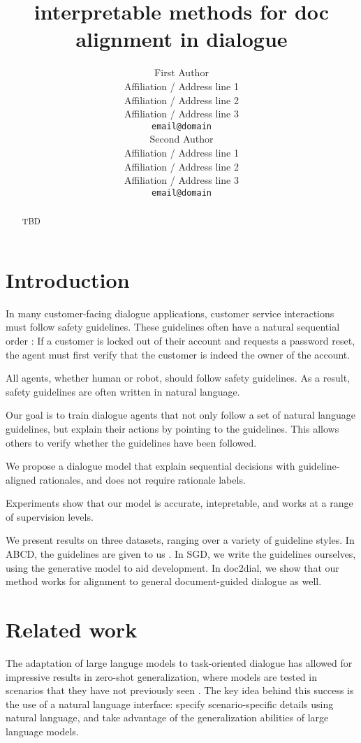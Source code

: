 \documentclass[11pt]{article}
\title{interpretable methods for doc alignment in dialogue}
\author{First Author \\
  Affiliation / Address line 1 \\
  Affiliation / Address line 2 \\
  Affiliation / Address line 3 \\
  \texttt{email@domain} \\\And
  Second Author \\
  Affiliation / Address line 1 \\
  Affiliation / Address line 2 \\
  Affiliation / Address line 3 \\
  \texttt{email@domain} \\}
\begin{document}
\maketitle
\begin{abstract}
TBD
\end{abstract}

\section{Introduction}
In many customer-facing dialogue applications,
customer service interactions must follow safety guidelines.
These guidelines often have a natural sequential order \cite{abcd}:
If a customer is locked out of their account and requests a password reset,
the agent must first verify that the customer is indeed the owner of the account.

All agents, whether human or robot, should follow safety guidelines.
As a result, safety guidelines are often written in natural language.

Our goal is to train dialogue agents that not only follow a set of natural language guidelines,
but explain their actions by pointing to the guidelines.
This allows others to verify whether the guidelines have been followed.

We propose a dialogue model
that explain sequential decisions with guideline-aligned rationales,
and does not require rationale labels.

Experiments show that our model is accurate,
intepretable,
and works at a range of supervision levels.

We present results on three datasets, ranging over a variety of guideline styles.
In ABCD, the guidelines are given to us \citet{abcd}.
In SGD, we write the guidelines ourselves,
using the generative model to aid development.
In doc2dial, we show that our method works for alignment to general document-guided
dialogue as well.

\section{Related work}
The adaptation of large languge models to task-oriented dialogue
has allowed for impressive results in zero-shot generalization,
where models are tested in scenarios that they have not previously seen
\cite{}.
The key idea behind this success is the use of a natural language interface:
specify scenario-specific details using natural language,
and take advantage of the generalization abilities of large language models.
\end{document}
